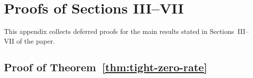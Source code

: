 \documentclass[journal,onecolumn]{IEEEtran}
\numberwithin{equation}{section}
\begin{document}
\section{Proofs of Sections III--VII}
\label{app:proofs}

This appendix collects deferred proofs for the main results stated in
Sections~III--VII of the paper.

\subsection{Proof of Theorem~\ref{thm:tight-zero-rate}}
\label{app:proof-tight-zero-rate}
\end{document}
